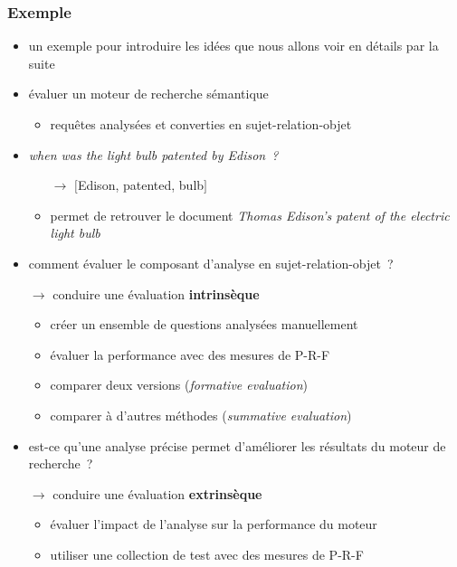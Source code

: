 \begin{frame}[allowframebreaks]
\frametitle{Exemple}

\begin{itemize} \itemsep0.8em
    \item un exemple pour introduire les idées que nous allons voir en détails 
          par la suite

    \item évaluer un moteur de recherche sémantique
    \begin{itemize}
        \item requêtes analysées et converties en sujet-relation-objet
    \end{itemize}

    \item \textit{when was the light bulb patented by Edison~?}
    \begin{itemize}
        \item[$\to$] $[$Edison, patented, bulb$]$
        \item permet de retrouver le document \og{}\textit{Thomas Edison's 
              patent of the electric light bulb}\fg{}
    \end{itemize}

    \framebreak

    \item comment évaluer le composant d'analyse en sujet-relation-objet~?

    \item[$\to$] conduire une évaluation \textbf{intrinsèque}
    \begin{itemize}
        \item créer un ensemble de questions analysées manuellement
        \item évaluer la performance avec des mesures de P-R-F
         \item comparer deux versions (\textit{formative evaluation})
        \item comparer à d'autres méthodes (\textit{summative evaluation})
    \end{itemize}

    \framebreak

    \item est-ce qu'une analyse précise permet d'améliorer les résultats du 
          moteur de recherche~?

    \item[$\to$] conduire une évaluation \textbf{extrinsèque}
    \begin{itemize}
        \item évaluer l'impact de l'analyse sur la performance du moteur
        \item utiliser une collection de test avec des mesures de P-R-F
    \end{itemize}


\end{itemize}
\end{frame}
